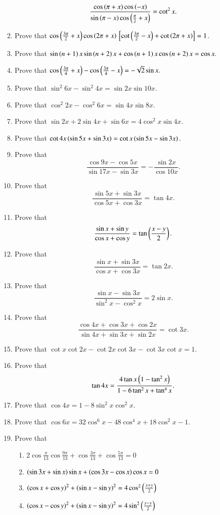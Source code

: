 \begin{enumerate}[label=\thesubsection.\arabic*,ref=\thesubsection.\theenumi,itemsep=1ex]
$$\frac{\cos\left(\pi+x\right)\cos\left(-x\right)}{\sin\left(\pi-x\right)\cos\left(\frac{\pi}{2}+x\right)}=\cot^{2}x.$$
%
\item Prove that
$\cos\left(\frac{3\pi}{2}+x\right)\cos\left(2\pi+x\right){}\left[\cot\left(\frac{3\pi}{2}-x\right)+\cot\left(2\pi +x\right)\right]=1$.
%
\item Prove that
$\sin\left(n+1\right)x\sin\left(n+2\right)x+\cos\left(n+1\right)x\cos\left(n+2\right)x=\cos x.$
%
\item Prove that
$\cos\left(\frac{3\pi}{4}+x\right)-\cos\left(\frac{3\pi}{4}-x\right)=-\sqrt 2\sin x.$
%
\item Prove that
$\sin^{2}6x-\sin^{2}4x=\sin2x\sin10x.$
%
\item Prove that
$\cos^{2}2x-\cos^{2}6x=\sin4x\sin8x.$
%
\item Prove that
$\sin2x+2\sin4x+\sin6x=4\cos^{2}x\sin4x.$
%
\item Prove that
$\cot4x\left(\sin5x+\sin3x\right)= \cot x\left(\sin5x-\sin3x\right).$
%
\item Prove that
$$\frac{\cos9x-\cos5x}{\sin17x-\sin3x}=-\frac{\sin2x}{\cos10x}.$$
%
\item Prove that
$$\frac{\sin5x+\sin3x}{\cos5x+\cos3x}=\tan4x.$$
%
\item Prove that
$$\frac{\sin x+\sin y}{\cos x+\cos y}=\tan\left(\frac{x-y}{2}\right).$$
%
\item Prove that
$$\frac{\sin x+\sin3x}{\cos x+\cos3x}=\tan2x.$$
%
\item Prove that
$$\frac{\sin x-\sin3x}{\sin^{2}x-\cos^{2}x}=2\sin x.$$
%
\item Prove that
$$\frac{\cos4x+\cos3x+\cos2x}{\sin4x+\sin3x+\sin2x}=\cot3x.$$
%
\item Prove that
$\cot x\cot2x-\cot2x\cot3x-\cot3x\cot x=1$.
%
\item Prove that
$$\tan4x=\frac{4\tan x\left(1-\tan^{2}x\right)}{1-6\tan^{2}x+\tan^{4}x}.$$
%
\item Prove that
$\cos4x=1-8\sin^{2}x\cos^{2}x$.
%
\item Prove that
$\cos6x=32\cos^{6}x-48\cos^{4}x+18\cos^{2}x-1$.
%
%
\item Prove that
\begin{enumerate}
\item 2$\cos\frac{\pi}{13}\cos\frac{9\pi}{13}+\cos\frac{3\pi}{13}+\cos\frac{5\pi}{13}=0$
\item $\left(\sin3x+\sin x\right)\sin x+\left(\cos3x-\cos x\right)\cos x=0$
\item $\left(\cos x+\cos y\right)^{2}+\left(\sin x-\sin y\right)^{2}=4\cos^{2}\left(\frac{x+y}{2}\right)$
\item $\left(\cos x-\cos y\right)^{2}+\left(\sin x-\sin y\right)^{2}=4\sin^{2}\left(\frac{x-y}{2}\right)$

\end{enumerate}
\end{enumerate}

